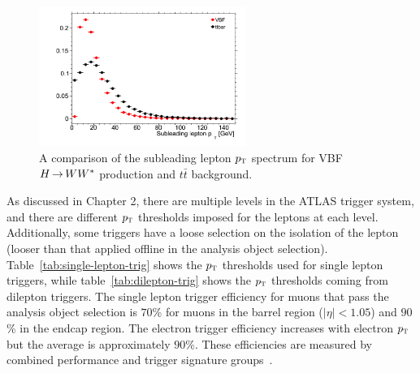 \begin{figure}[h!]
  \centering
  \captionsetup{justification=centering}

  \includegraphics[width=0.6\textwidth]{figures/lepton_pt}
  \caption{A comparison of the subleading lepton $p_{\textrm{\footnotesize\sc t}}$ spectrum for VBF $H{\,{\rightarrow}\,}WW^\ast$ production and $t\bar{t}$ background.}
  \label{fig:leptonpt}
\end{figure}

As discussed in Chapter 2, there are multiple levels in the ATLAS trigger system, and there are different $p_{\textrm{\footnotesize\sc t}}$ thresholds imposed for the leptons at each level. Additionally, some triggers have a loose selection on the isolation of the lepton (looser than that applied offline in the analysis object selection). Table~\ref{tab:single-lepton-trig} shows the $p_{\textrm{\footnotesize\sc t}}$ thresholds used for single lepton triggers, while table~\ref{tab:dilepton-trig} shows the $p_{\textrm{\footnotesize\sc t}}$ thresholds coming from dilepton triggers. The single lepton trigger efficiency for muons that pass the analysis object selection is $70$\% for muons in the barrel region ($|\eta| < 1.05$) and $90$\% in the endcap region. The electron trigger efficiency increases with electron $p_{\textrm{\footnotesize\sc t}}$ but the average is approximately $90$\%. These efficiencies are measured by combined performance and trigger signature groups~\cite{MuonTrigger2012,ElectronTrigger2012}.

